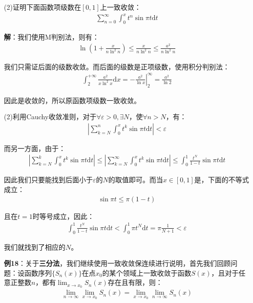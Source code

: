 \documentclass{ctexart}
\let\oldtextbf\textbf
\renewcommand{\textbf}[1]{\textcolor{brown!50!red}{\oldtextbf{#1}}}
\begin{document}
(2)证明下面函数项级数在$[0,1]$上一致收敛：
\begin{align*}
    \sum_{n=0}^\infty
\int_0^x t^n\sin \pi t\mathrm{d}t
\end{align*}

\textbf{\color{brown!50!red}解}：我们使用M判别法，则有：
\begin{align*}
\ln(1+\frac{x}{n\ln^2n})\leq\frac{x}{n\ln^2n}\leq\frac{a^2}{n\ln^2n}    
\end{align*}

我们只需证后面的级数收敛。而后面的级数是正项级数，使用积分判别法：
\begin{align*}
\int_2^{+\infty}\frac{a^2}{x\ln^2x}\mathrm{d}x=\left.-\frac{a^2}{\ln x}\right|_2^\infty =\frac{a^2}{\ln 2}     
\end{align*}

因此是收敛的，所以原函数项级数一致收敛。

(2)利用Cauchy收敛准则，对于$\forall \varepsilon>0,\exists N$，使$\forall n>N$，有：
\begin{align*}
    |\sum_{k=N}^n
\int_0^x t^k\sin \pi t\mathrm{d}t|<\varepsilon
\end{align*}

而另一方面，由于：
\begin{align*}
     |\sum_{k=N}^k
\int_0^x t^k\sin \pi t\mathrm{d}t|\leq|\sum_{k=N}^\infty
\int_0^x t^k\sin \pi t\mathrm{d}t|\leq
\int_0^1 \frac{t^N}{1-t}\sin \pi t\mathrm{d}t
\end{align*}

因此我们只要能找到后面小于$\varepsilon$的$N$的取值即可。而当$x\in[0,1]$是，下面的不等式成立：
\begin{align*}
    \sin\pi t\leq\pi (1-t)
\end{align*}

且在$t=1$时等号成立，因此：
\begin{align*}
   \int_0^1 \frac{t^N}{1-t}\sin \pi t\mathrm{d}t<\int_0^1 \pi t^N\mathrm{d}t=\pi \frac{1}{N+1}<\varepsilon   
\end{align*}

我们就找到了相应的$N$。

\textbf{\color{brown!50!red}例18}：关于\textbf{\color{brown!50!red}三分法}，我们继续使用一致收敛保连续进行说明，首先我们回顾问题：设函数序列$\{S_n(x)\}$在点$x_0$的某个领域上一致收敛于函数$S(x)$，且对于任意正整数$n$，都有$\lim_{x\to x_0}S_n(x)$存在且有限，则：
\begin{align*}
    \lim_{n\to\infty}\lim_{x\to x_0}S_n(x)=\lim_{x\to x_0}\lim_{n\to\infty}S_n(x)
\end{align*}
\end{document}
